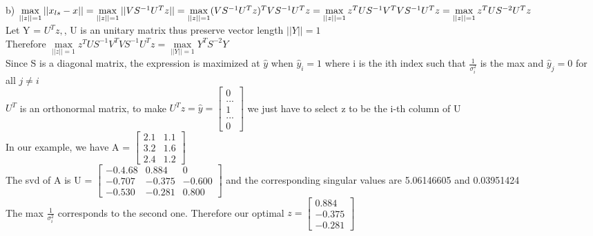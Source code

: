 \documentclass[11pt]{article}
\begin{document}
b) $\max\limits_{||z|| = 1} ||x_{ls}-x|| = \max\limits_{||z|| = 1} ||VS^{-1}U^Tz|| = \max\limits_{||z|| = 1} (VS^{-1}U^Tz)^T VS^{-1}U^Tz \\=  \max\limits_{||z|| = 1} z^TUS^{-1}V^TVS^{-1}U^Tz
 = \max\limits_{||z|| = 1} z^TUS^{-2}U^Tz$\\ Let Y = $U^Tz,$, U is an unitary matrix thus preserve vector length $ ||Y|| = 1$\\
 Therefore $\max\limits_{||z|| = 1} z^TUS^{-1}V^TVS^{-1}U^Tz = \max\limits_{||Y|| = 1} Y^T S^{-2}Y$\\
  Since S is a diagonal matrix, the expression is maximized at $\hat{y}$ when $\hat{y}_i = 1$ where i is the ith index such that $\frac{1}{\sigma_i^2}$ is the max and $ \hat{y}_j = 0 $ for all $j\neq i$\\
  $U^T$ is an orthonormal matrix, to make $U^Tz = \hat{y} = \begin{bmatrix}
  0\\...\\1\\...\\0
  \end{bmatrix}$ we just have to select z to be the i-th column of U\\
  In our example, we have A = $\begin{bmatrix}
  2.1&1.1 \\3.2 & 1.6\\ 2.4&1.2
  \end{bmatrix}$\\
  The svd of A is U = $ \begin{bmatrix}
   -0.4.68 &0.884& 0\\
  -0.707& -0.375&  -0.600\\
  -0.530& -0.281&  0.800
  \end{bmatrix}  $ and the corresponding singular values are 5.06146605 and  0.03951424\\
  The max $\frac{1}{\sigma_i^2}$ corresponds to the second one. Therefore our optimal $z = \begin{bmatrix}
  0.884\\-0.375 \\ -0.281
  \end{bmatrix}$\\
  
\end{document}
